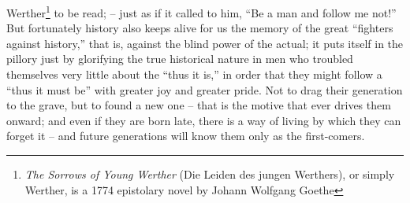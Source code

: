 Werther\footnote{\textit{The Sorrows of Young Werther} (Die Leiden des jungen Werthers), or simply Werther, is a 1774 epistolary novel by Johann Wolfgang Goethe} to be read; -- just as if it called to him, \enquote{Be a man and
follow me not!} But fortunately history also keeps alive for us the
memory of the great \enquote{fighters against history,} that is, against the
blind power of the actual; it puts itself in the pillory just by
glorifying the true historical nature in men who troubled themselves
very little about the \enquote{thus it is,} in order that they might follow a
\enquote{thus it must be} with greater joy and greater pride. Not to drag
their generation to the grave, but to found a new one -- that is the
motive that ever drives them onward; and even if they are born late,
there is a way of living by which they can forget it -- and future
generations will know them only as the first-comers.

